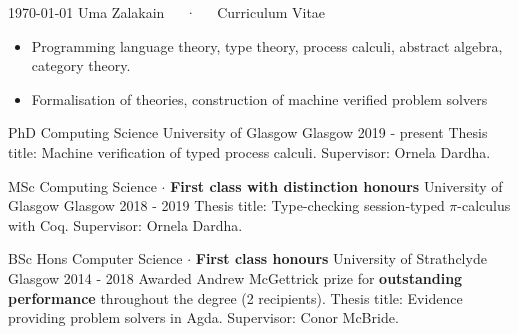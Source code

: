 \documentclass[11pt, a4paper]{awesome-cv}
\begin{document}
\makecvheader

\makecvfooter
  {\today}
  {Uma Zalakain~~~·~~~Curriculum Vitae}
  {\thepage}



\begin{itemize}[noitemsep,wide=0pt]
    \item {Programming language theory, type theory, process calculi, abstract
        algebra, category theory.}
    \item {Formalisation of theories, construction of machine verified
        problem solvers}
\end{itemize}


\begin{cventries}
    \cventry
      {PhD Computing Science} %
      {University of Glasgow} %
      {Glasgow} %
      {2019 - present} %
      {
          Thesis title: Machine verification of typed process calculi.\newline
          Supervisor: Ornela Dardha.\newline
      }

    \cventry
      {MSc Computing Science $\cdot$ \textbf{First class with distinction honours}} %
      {University of Glasgow} %
      {Glasgow} %
      {2018 - 2019} %
      {
          Thesis title: Type-checking session-typed $\pi$-calculus with Coq.\newline
          Supervisor: Ornela Dardha.\newline
      }

    \cventry
      {BSc Hons Computer Science $\cdot$ \textbf{First class honours}} %
      {University of Strathclyde} %
      {Glasgow} %
      {2014 - 2018} %
      {
          Awarded Andrew McGettrick prize for \textbf{outstanding performance}
          throughout the degree (2 recipients).\newline
          Thesis title: Evidence providing problem solvers in Agda.\newline
          Supervisor: Conor McBride.\newline
      }
\end{cventries}
\end{document}
